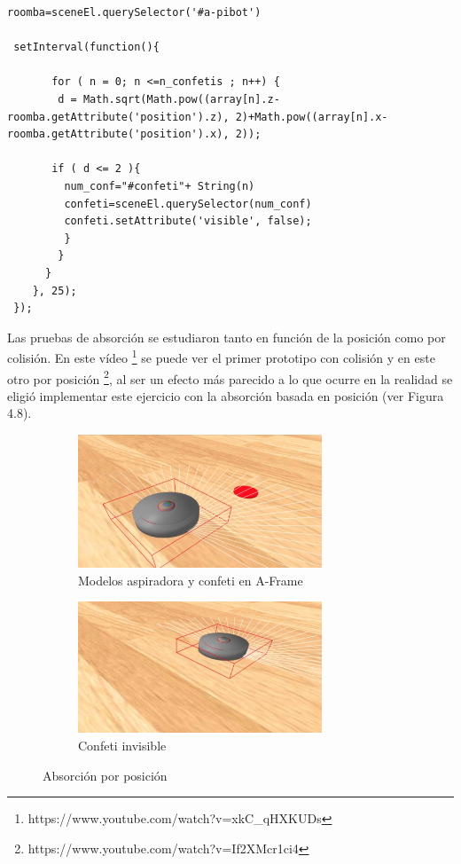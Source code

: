 \begin{lstlisting}
roomba=sceneEl.querySelector('#a-pibot')

 setInterval(function(){

       for ( n = 0; n <=n_confetis ; n++) {
        d = Math.sqrt(Math.pow((array[n].z-roomba.getAttribute('position').z), 2)+Math.pow((array[n].x-roomba.getAttribute('position').x), 2));

       if ( d <= 2 ){
         num_conf="#confeti"+ String(n)
         confeti=sceneEl.querySelector(num_conf)
         confeti.setAttribute('visible', false);
         }
        }
      }
    }, 25);
 });
\end{lstlisting}

Las pruebas de absorción se estudiaron tanto en función de la posición como por colisión. En este vídeo \footnote{https://www.youtube.com/watch?v=xkC\_qHXKUDs} se puede ver el primer prototipo con colisión y en este otro por posición \footnote{https://www.youtube.com/watch?v=If2XMcr1ci4}, al ser un efecto más parecido a lo que ocurre en la realidad se eligió implementar este ejercicio con la absorción basada en posición (ver Figura 4.8).

\begin{figure}[H]
  \begin{subfigure}[b]{0.5\textwidth}
  \centering
    \includegraphics[width=0.8\textwidth, height=0.5\textwidth]{chapters/images/prototiporoomba.png}
    \caption{Modelos aspiradora y confeti en A-Frame}
    \label{fig:f1}
  \end{subfigure}
  \hfill
  \begin{subfigure}[b]{0.5\textwidth}
  \centering
    \includegraphics[width=0.8\textwidth, height=0.5\textwidth]{chapters/images/prototiporoomba2.png}
	\caption{Confeti invisible}    
    \label{fig:f2}
 
  \end{subfigure}
  \caption{Absorción por posición}
\end{figure}


